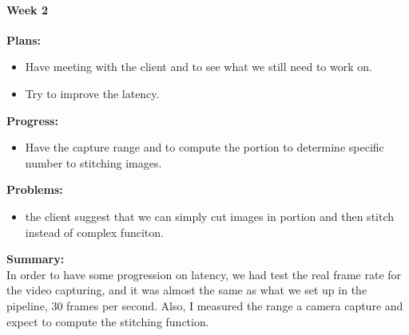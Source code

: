 \paragraph{Week 2}
\begin{adjustwidth}{2.5em}{0pt}
    \vspace{-0.5cm}\textbf{Plans:}
    \vspace{-0.5cm}
    \begin{itemize}
        \item Have meeting with the client and to see what we still need to work on.
        \item Try to improve the latency.
    \end{itemize} 
    \vspace{-0.3cm}\textbf{Progress:}
    \vspace{-0.5cm}
    \begin{itemize}
        \item Have the capture range and to compute the portion to determine specific number to stitching images.
    \end{itemize} 
    \vspace{-0.3cm}\textbf{Problems:}
    \vspace{-0.5cm}
    \begin{itemize}
        \item the client suggest that we can simply cut images in portion and then stitch instead of complex funciton.
    \end{itemize}  
    \vspace{-0.3cm}\noindent\textbf{Summary:}\\
    \noindent In order to have some progression on latency, we had test the real frame rate for the video 
    capturing, and it was almost the same as what we set up in the pipeline, 30 frames per second. Also, I 
    measured the range a camera capture and expect to compute the stitching function. \\
\end{adjustwidth} 

